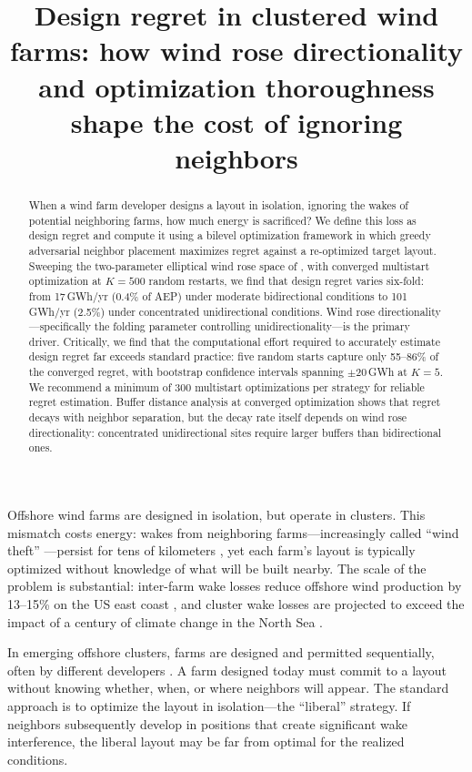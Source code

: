 \documentclass[manuscript, 12pt]{copernicus}
\title{Design regret in clustered wind farms: how wind rose directionality and optimization thoroughness shape the cost of ignoring neighbors}
\affil[1]{Technical University of Denmark, Department of Wind and Energy Systems, Roskilde, Denmark}
\begin{document}
\maketitle

\begin{abstract}
When a wind farm developer designs a layout in isolation, ignoring the wakes of potential neighboring farms, how much energy is sacrificed?
We define this loss as design regret and compute it using a bilevel optimization framework in which greedy adversarial neighbor placement maximizes regret against a re-optimized target layout.
Sweeping the two-parameter elliptical wind rose space of \citet{Hart2025}, with converged multistart optimization at $K = 500$ random restarts, we find that design regret varies six-fold: from 17\,GWh/yr (0.4\% of AEP) under moderate bidirectional conditions to 101\,GWh/yr (2.5\%) under concentrated unidirectional conditions.
Wind rose directionality---specifically the folding parameter controlling unidirectionality---is the primary driver.
Critically, we find that the computational effort required to accurately estimate design regret far exceeds standard practice: five random starts capture only 55--86\% of the converged regret, with bootstrap confidence intervals spanning $\pm$20\,GWh at $K = 5$.
We recommend a minimum of 300 multistart optimizations per strategy for reliable regret estimation.
Buffer distance analysis at converged optimization shows that regret decays with neighbor separation, but the decay rate itself depends on wind rose directionality: concentrated unidirectional sites require larger buffers than bidirectional ones.
\end{abstract}

\introduction

Offshore wind farms are designed in isolation, but operate in clusters.
This mismatch costs energy: wakes from neighboring farms---increasingly called ``wind theft'' \citep{Finseraas2024, Du2026}---persist for tens of kilometers \citep{Platis2018, Schneemann2020, Canadillas2022}, yet each farm's layout is typically optimized without knowledge of what will be built nearby.
The scale of the problem is substantial: inter-farm wake losses reduce offshore wind production by 13--15\% on the US east coast \citep{Rosencrans2024}, and cluster wake losses are projected to exceed the impact of a century of climate change in the North Sea \citep{Warder2025}.

In emerging offshore clusters, farms are designed and permitted sequentially, often by different developers \citep{Fliegner2025}.
A farm designed today must commit to a layout without knowing whether, when, or where neighbors will appear.
The standard approach is to optimize the layout in isolation---the ``liberal'' strategy.
If neighbors subsequently develop in positions that create significant wake interference, the liberal layout may be far from optimal for the realized conditions.
\end{document}
